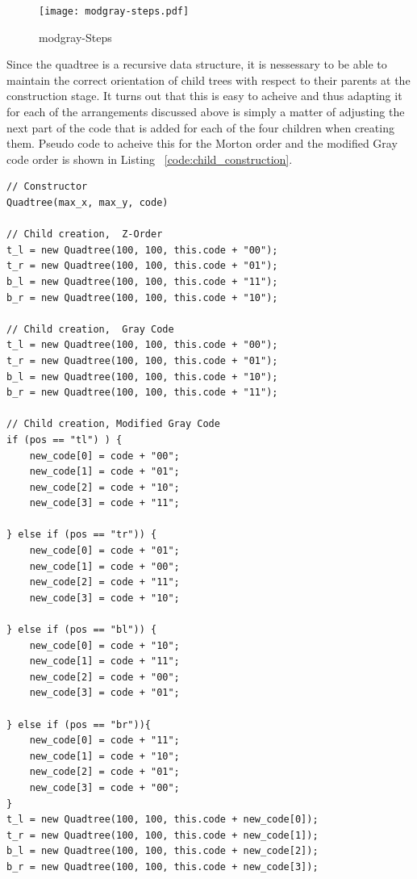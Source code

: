 \begin{figure}[ht]
	\centering
	\texttt{[image: modgray-steps.pdf]}
	\caption{modgray-Steps}
	\label{fig:modgray-steps}
\end{figure}

Since the quadtree is a recursive data structure, it is nessessary to be able
to maintain the correct orientation of child trees with respect to their
parents at the construction stage. It turns out that this is easy to acheive
and thus adapting it for each of the arrangements discussed above is simply a
matter of adjusting the next part of the code that is added for each of the
four children when creating them. Pseudo code to acheive this for the Morton
order and the modified Gray code order is shown in Listing
~\ref{code:child_construction}.

\begin{lstlisting}[caption={Code to generate children of the current quadtree
while maintaining the correct ordering.},label=code:child_construction]
// Constructor
Quadtree(max_x, max_y, code)

// Child creation,  Z-Order
t_l = new Quadtree(100, 100, this.code + "00");
t_r = new Quadtree(100, 100, this.code + "01");
b_l = new Quadtree(100, 100, this.code + "11");
b_r = new Quadtree(100, 100, this.code + "10");

// Child creation,  Gray Code
t_l = new Quadtree(100, 100, this.code + "00");
t_r = new Quadtree(100, 100, this.code + "01");
b_l = new Quadtree(100, 100, this.code + "10");
b_r = new Quadtree(100, 100, this.code + "11");

// Child creation, Modified Gray Code
if (pos == "tl") ) {
	new_code[0] = code + "00";
	new_code[1] = code + "01";
	new_code[2] = code + "10";
	new_code[3] = code + "11";

} else if (pos == "tr")) {
	new_code[0] = code + "01";
	new_code[1] = code + "00";
	new_code[2] = code + "11";
	new_code[3] = code + "10";

} else if (pos == "bl")) {
	new_code[0] = code + "10";
	new_code[1] = code + "11";
	new_code[2] = code + "00";
	new_code[3] = code + "01";

} else if (pos == "br")){
	new_code[0] = code + "11";
	new_code[1] = code + "10";
	new_code[2] = code + "01";
	new_code[3] = code + "00";
}
t_l = new Quadtree(100, 100, this.code + new_code[0]);
t_r = new Quadtree(100, 100, this.code + new_code[1]);
b_l = new Quadtree(100, 100, this.code + new_code[2]);
b_r = new Quadtree(100, 100, this.code + new_code[3]);
\end{lstlisting}

